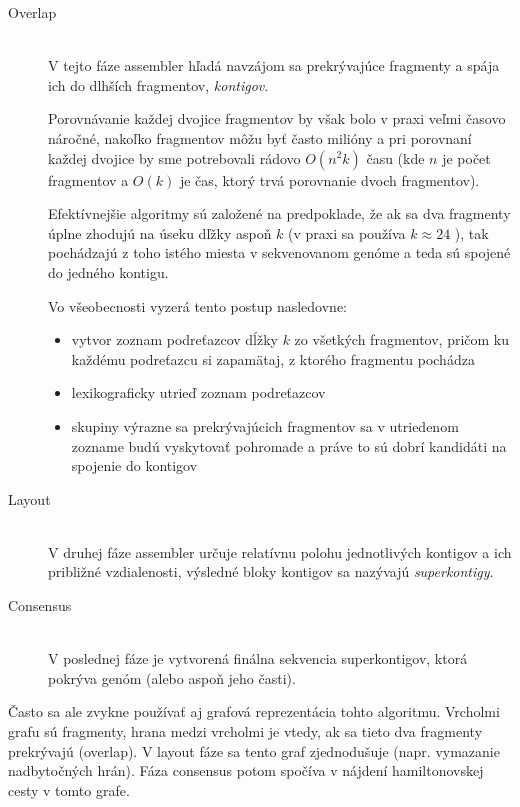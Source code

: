     \begin{description}
        \item[Overlap]        \hfill \\
        V tejto fáze assembler hľadá navzájom sa prekrývajúce fragmenty a spája
        ich do dlhších fragmentov, \emph{kontigov}.
        
        Porovnávanie každej dvojice fragmentov by však bolo v praxi veľmi časovo
        náročné, nakoľko fragmentov môžu byť často milióny a pri porovnaní
        každej dvojice by sme potrebovali rádovo $O(n^2k)$ času (kde $n$ je
        počet fragmentov a $O(k)$ je čas, ktorý trvá porovnanie dvoch
        fragmentov).
        
        Efektívnejšie algoritmy sú založené na predpoklade, že ak sa dva
        fragmenty úplne zhodujú na úseku dľžky aspoň $k$ (v praxi sa používa $k
        \approx 24$ ), tak pochádzajú z toho istého miesta v sekvenovanom genóme
        a teda sú spojené do jedného kontigu.
        
        Vo všeobecnosti vyzerá tento postup nasledovne:
        \begin{itemize}
            \item vytvor zoznam podreťazcov dĺžky $k$ zo všetkých fragmentov,
            pričom ku každému podreťazcu si zapamätaj, z ktorého fragmentu
            pochádza
            \item lexikograficky utrieď zoznam podreťazcov
            \item skupiny výrazne sa prekrývajúcich fragmentov sa v utriedenom
            zozname budú vyskytovať pohromade a práve to sú dobrí kandidáti na
            spojenie do kontigov
        \end{itemize}
        \item[Layout] \hfill \\
        V druhej fáze assembler určuje relatívnu polohu jednotlivých kontigov a
        ich približné vzdialenosti, výsledné bloky kontigov sa nazývajú
        \emph{superkontigy}.
        \item[Consensus] \hfill \\
        V poslednej fáze je vytvorená finálna sekvencia superkontigov, ktorá
        pokrýva genóm (alebo aspoň jeho časti).
    \end{description}
    
    Často sa ale zvykne používať aj grafová reprezentácia tohto algoritmu.
    Vrcholmi grafu sú fragmenty, hrana medzi vrcholmi je vtedy, ak sa tieto dva
    fragmenty prekrývajú (overlap). V layout fáze sa tento graf zjednodušuje
    (napr. vymazanie nadbytočných hrán). Fáza consensus potom spočíva v nájdení
    hamiltonovskej cesty v tomto grafe.
    
